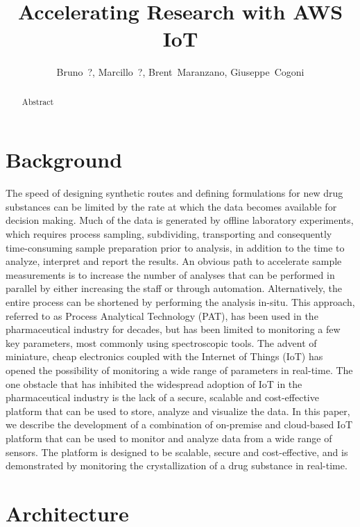 \documentclass[twocolumn,5p]{elsevier}
\begin{document}
\title{Accelerating Research with AWS IoT}
\author{Bruno~?, Marcillo~?, Brent~Maranzano, Giuseppe~Cogoni}

\begin{abstract}
Abstract
\end{abstract}

\maketitle
\tableofcontents

\section{Background}
\label{sec:background}

The speed of designing synthetic routes and defining formulations for new drug
substances can be limited by the rate at which the data becomes available for
decision making. Much of the data is generated by offline laboratory
experiments, which requires process sampling, subdividing, transporting and
consequently time-consuming sample preparation prior to analysis, in addition
to the time to analyze, interpret and report the results. An obvious path to
accelerate sample measurements is to increase the number of analyses that can
be performed in parallel by either increasing the staff or through automation.
Alternatively, the entire process can be shortened by performing the analysis
in-situ. This approach, referred to as Process Analytical Technology (PAT), has
been used in the pharmaceutical industry for decades, but has been limited to
monitoring a few key parameters, most commonly using spectroscopic tools. The
advent of miniature, cheap electronics coupled with the Internet of Things
(IoT) has opened the possibility of monitoring a wide range of parameters in
real-time. The one obstacle that has inhibited the widespread adoption of IoT
in the pharmaceutical industry is the lack of a secure, scalable and
cost-effective platform that can be used to store, analyze and visualize the
data. In this paper, we describe the development of a combination of on-premise
and cloud-based IoT platform that can be used to monitor and analyze data from
a wide range of sensors. The platform is designed to be scalable, secure and
cost-effective, and is demonstrated by monitoring the crystallization of a drug
substance in real-time.

\section{Architecture}
\label{sec:architecture}
\end{document}
